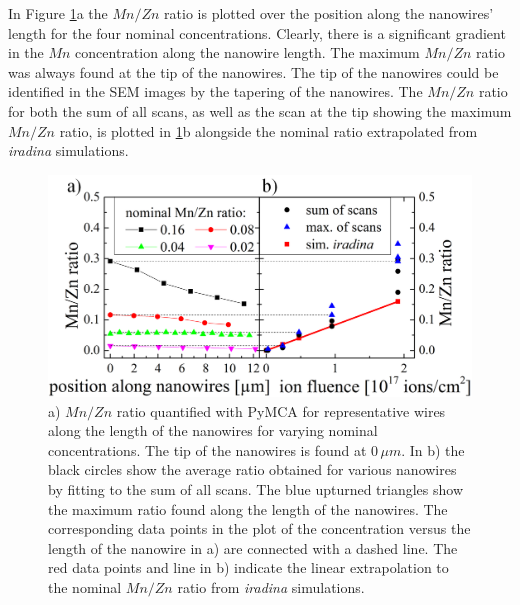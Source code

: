 In Figure \ref{MnZn1}a the $Mn/Zn$ ratio is plotted over the position along the nanowires' length for the four nominal concentrations. Clearly, there is a significant gradient in the $Mn$ concentration along the nanowire length. The maximum $Mn/Zn$ ratio was always found at the tip of the nanowires. The tip of the nanowires could be identified in the SEM images by the tapering of the nanowires. The $Mn/Zn$ ratio for both the sum of all scans, as well as the scan at the tip showing the maximum $Mn/Zn$ ratio, is plotted in \ref{MnZn1}b alongside the nominal ratio extrapolated from \emph{iradina} simulations.

\begin{figure}
	\centering
		\includegraphics[width=.88\textwidth]{images/MnZn1.png}
	\caption{a) $Mn/Zn$ ratio quantified with PyMCA for representative wires along the length of the nanowires for varying nominal concentrations. The tip of the nanowires is found at $0\,\mu m$. In b) the black circles show the average ratio obtained for various nanowires by fitting to the sum of all scans. The blue upturned triangles show the maximum ratio found along the length of the nanowires. The corresponding data points in the plot of the concentration versus the length of the nanowire in a) are connected with a dashed line. The red data points and line in b) indicate the linear extrapolation to the nominal $Mn/Zn$ ratio from \emph{iradina} simulations.}
	\label{MnZn1}
\end{figure} 
 
